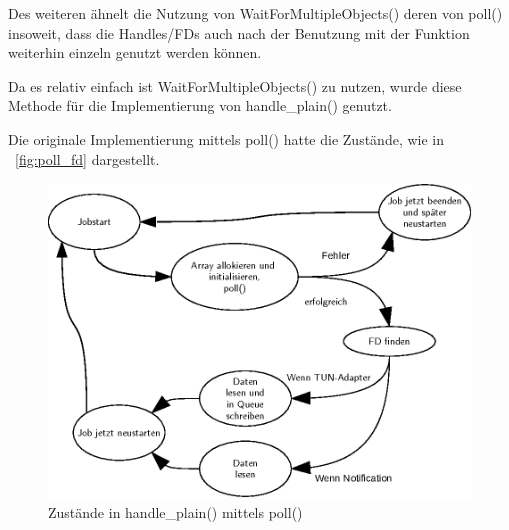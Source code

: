 Des weiteren ähnelt die Nutzung von WaitForMultipleObjects() deren von poll()
insoweit, dass die Handles/\acp{FD} auch nach der Benutzung mit der Funktion
weiterhin einzeln genutzt werden können.

Da es relativ einfach ist WaitForMultipleObjects() zu nutzen, wurde diese Methode
für die Implementierung von handle\_plain() genutzt.

Die originale Implementierung mittels poll() hatte die Zustände, wie in ~\autoref{fig:poll_fd}
dargestellt.

\begin{figure}
\caption{Zustände in handle\_plain() mittels poll()}
\label{fig:poll_fd}
\centering
\def\svgwidth{\columnwidth}
\includegraphics[width=\textwidth]{poll_fd.eps}
\end{figure}

